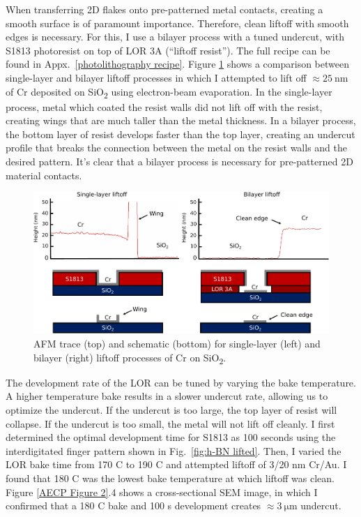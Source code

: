 \documentclass[double,12pt,1in,seploa]{beavtex}
\begin{document}
When transferring 2D flakes onto pre-patterned metal contacts, creating a smooth surface is of paramount importance. Therefore, clean liftoff with smooth edges is necessary. For this, I use a bilayer process with a tuned undercut, with S1813 photoresist on top of LOR 3A (“liftoff resist”). The full recipe can be found in Appx.\ \ref{photolithography recipe}. Figure \ref{fig:Liftoff AFM} shows a comparison between single-layer and bilayer liftoff processes in which I attempted to lift off $\approx \SI{25}{\nano\meter}$ of Cr deposited on SiO\textsubscript{2} using electron-beam evaporation. In the single-layer process, metal which coated the resist walls did not lift off with the resist, creating wings that are much taller than the metal thickness. In a bilayer process, the bottom layer of resist develops faster than the top layer, creating an undercut profile that breaks the connection between the metal on the resist walls and the desired pattern. It’s clear that a bilayer process is necessary for pre-patterned 2D material contacts. 




\begin{figure}
    \includegraphics[width = 1\textwidth]{liftoff AFM traces comparison.pdf}
    \caption{AFM trace (top) and schematic (bottom) for single-layer (left) and bilayer (right) liftoff processes of Cr on SiO\textsubscript{2}.}
    \label{fig:Liftoff AFM}
\end{figure}

The development rate of the LOR can be tuned by varying the bake temperature. A higher temperature bake results in a slower undercut rate, allowing us to optimize the undercut. If the undercut is too large, the top layer of resist will collapse. If the undercut is too small, the metal will not lift off cleanly. I first determined the optimal development time for S1813 as 100 seconds using the interdigitated finger pattern shown in Fig.\ \ref{fig:h-BN lifted}. Then, I varied the LOR bake time from 170 C to 190 C and attempted liftoff of 3/20 nm Cr/Au. I found that 180 C was the lowest bake temperature at which liftoff was clean. Figure \ref{AECP Figure 2}.4 shows a cross-sectional SEM image, in which I confirmed that a 180 C bake and 100 s development creates $\approx \SI{3}{\micro\meter}$ undercut.
\end{document}
